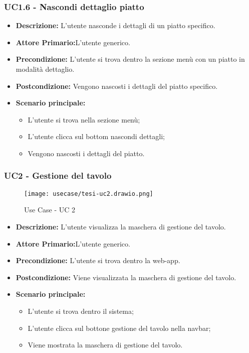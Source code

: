 \subsubsection{UC1.6 - Nascondi dettaglio piatto}
\begin{itemize}
    \item \textbf{Descrizione:} L'utente nasconde i dettagli di un piatto specifico.
    \item \textbf{Attore Primario:}L'utente generico.
    \item \textbf{Precondizione:} L'utente si trova dentro la sezione menù con un piatto in modalità dettaglio.
    \item \textbf{Postcondizione:} Vengono nascosti i dettagli del piatto specifico.
    \item \textbf{Scenario principale:}  
    \begin{itemize}
        \item L'utente si trova nella sezione menù;
        \item L'utente clicca sul bottom nascondi dettagli;
        \item Vengono nascosti i dettagli del piatto.
    \end{itemize}
\end{itemize}
\subsubsection{UC2 - Gestione del tavolo}
\begin{figure}[H]
    \centering
    \texttt{[image: usecase/tesi-uc2.drawio.png]}
    \caption{Use Case - UC 2}
\end{figure}
\begin{itemize}
    \item \textbf{Descrizione:} L'utente visualizza la maschera di gestione del tavolo.
    \item \textbf{Attore Primario:}L'utente generico.
    \item \textbf{Precondizione:} L'utente si trova dentro la web-app.
    \item \textbf{Postcondizione:} Viene visualizzata la maschera di gestione del tavolo.
    \item \textbf{Scenario principale:}
    \begin{itemize}
        \item L'utente si trova dentro il sistema;
        \item L'utente clicca sul bottone gestione del tavolo nella navbar;
        \item Viene mostrata la maschera di gestione del tavolo.
    \end{itemize}
\end{itemize}
